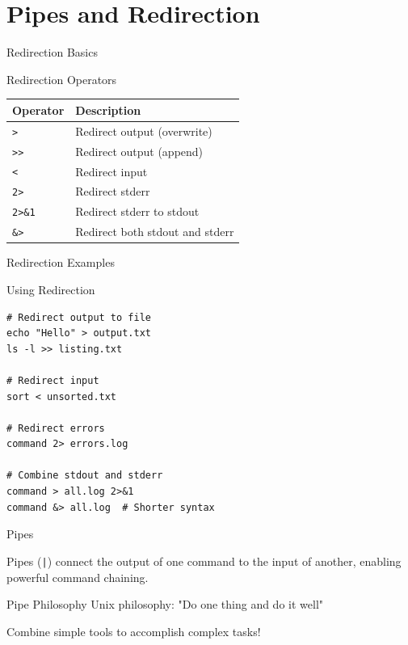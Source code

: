 \documentclass[presentation,aspectratio=1610]{beamer}
\begin{document}
\section*{Pipes and Redirection}
\label{sec:org26a5b65}

\begin{frame}[label={sec:org76f89d8},fragile]{Redirection Basics}
 \begin{block}{Redirection Operators}
\begin{center}
\begin{tabular}{ll}
Operator & Description\\
\hline
\texttt{>} & Redirect output (overwrite)\\
\texttt{>{}>{}} & Redirect output (append)\\
\texttt{<} & Redirect input\\
\texttt{2>} & Redirect stderr\\
\texttt{2>\&1} & Redirect stderr to stdout\\
\texttt{\&>} & Redirect both stdout and stderr\\
\end{tabular}
\end{center}
\end{block}
\end{frame}
\begin{frame}[label={sec:org92cbf7b},fragile]{Redirection Examples}
 \begin{block}{Using Redirection}
\begin{verbatim}
# Redirect output to file
echo "Hello" > output.txt
ls -l >> listing.txt

# Redirect input
sort < unsorted.txt

# Redirect errors
command 2> errors.log

# Combine stdout and stderr
command > all.log 2>&1
command &> all.log  # Shorter syntax
\end{verbatim}
\end{block}
\end{frame}
\begin{frame}[label={sec:org65f0c32},fragile]{Pipes}
 \begin{definition}\label{sec:org135532b}
Pipes (\texttt{|}) connect the output of one command to the input of another, enabling powerful command chaining.
\end{definition}
\begin{exampleblock}{Pipe Philosophy}\label{sec:org098d720}
Unix philosophy: "Do one thing and do it well"

Combine simple tools to accomplish complex tasks!
\end{exampleblock}
\end{frame}
\end{document}

